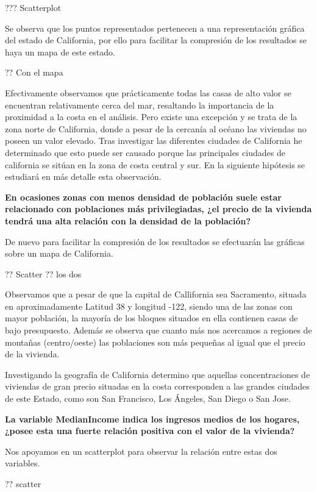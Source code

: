 {??? Scatterplot

Se observa que los puntos representados pertenecen a una representación gráfica del estado de California, por ello para facilitar la compresión de los resultados se haya un mapa de este estado.

?? Con el mapa

Efectivamente observamos que prácticamente todas las casas de alto valor se encuentran relativamente cerca del mar, resaltando la importancia de la proximidad a la costa en el análisis. 
Pero existe una excepción y se trata de la zona norte de California, donde a pesar de la cercanía al océano las viviendas no poseen un valor elevado. Tras investigar las diferentes ciudades de California he determinado que esto puede ser causado porque las principales ciudades de california se sitúan en la zona de costa central y sur. En la siguiente hipótesis se estudiará en más detalle esta observación.




\textbf{En ocasiones zonas con menos densidad de población suele estar relacionado con poblaciones más privilegiadas, ¿el precio de la vivienda tendrá una alta relación con la densidad de la población?}

De nuevo para facilitar la compresión de los resultados se efectuarán las gráficas sobre un mapa de California.

?? Scatter
?? los dos

Observamos que a pesar de que la capital de Callifornia sea Sacramento, situada en aproximadamente Latitud 38 y longitud -122, siendo una de las zonas con mayor población, la mayoría de los bloques situados en ella contienen casas de bajo presupuesto. Además se observa que cuanto más nos acercamos a regiones de montañas (centro/oeste) las poblaciones son más pequeñas al igual que el precio de la vivienda.

Investigando la geografía de California determino que aquellas concentraciones de viviendas de gran precio situadas en la costa corresponden a las grandes ciudades de este Estado, como son San Francisco, Los Ángeles, San Diego o San Jose. 



\textbf{La variable MedianIncome indica los ingresos medios de los hogares, ¿posee esta una fuerte relación positiva con el valor de la vivienda?}

Nos apoyamos en un scatterplot para observar la relación entre estas dos variables.

?? scatter

}
